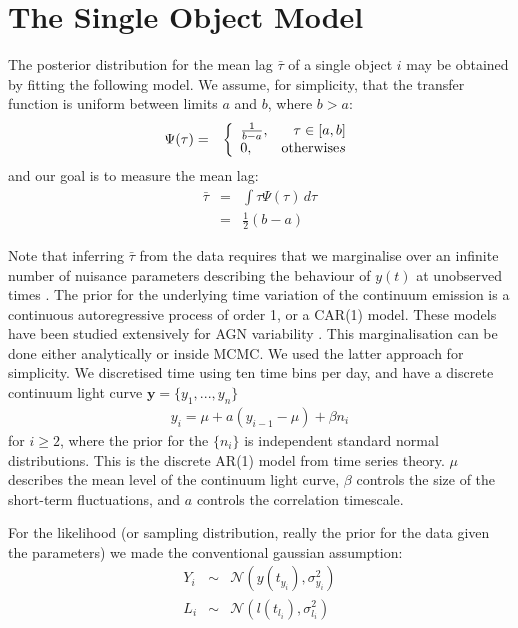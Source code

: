 \documentclass[useAMS,usenatbib]{mn2e}
\begin{document}
\section{The Single Object Model}
The posterior distribution for the mean lag $\bar{\tau}$ of a single object
$i$ may be obtained
by fitting the following model. We assume, for simplicity, that
the transfer function is uniform
between limits $a$ and $b$, where $b > a$:
\begin{eqnarray}
\Psi(\tau) &=& \left\{
\begin{array}{lr}
\frac{1}{b-a}, & \tau \in [a,b]\\
0, & \textnormal{otherwise}s
\end{array}\right.
\end{eqnarray}
and our goal is to measure the mean lag:
\begin{eqnarray}
\bar{\tau} &=& \int \tau \Psi(\tau) \, d\tau\\
&=& \frac{1}{2}(b-a)
\end{eqnarray}

Note that inferring $\bar{\tau}$ from the data requires that we
marginalise over an infinite number of nuisance parameters describing the
behaviour of $y(t)$ at unobserved times \citep{pancoast}.
The prior for the underlying time variation of the continuum emission is
a continuous autoregressive process of order 1, or a CAR(1) model. These models
have been studied extensively for AGN variability
\citep[e.g.][]{2009ApJ...698..895K, 2011ApJ...735...80Z, 2013ApJ...765..106Z}.
This marginalisation can be done
either analytically or inside MCMC. We used the latter approach for simplicity.
We discretised
time using ten time bins per day, and have a discrete continuum light curve
$\mathbf{y} = \{y_1, ..., y_n\}$
\begin{eqnarray}
y_i = \mu + a\left(y_{i-1} - \mu\right) + \beta n_i
\end{eqnarray}
for $i \geq 2$, where the prior for the $\{n_i\}$ is independent standard
normal distributions. This is the discrete AR(1) model from time series theory.
$\mu$ describes the mean level of the continuum light curve, $\beta$ controls
the size of the short-term fluctuations, and $a$ controls the correlation
timescale.

For the likelihood (or sampling distribution, really the prior for the data
given the parameters) we made the conventional gaussian assumption:
\begin{eqnarray}
Y_i &\sim& \mathcal{N}\left(y(t_{y_i}), \sigma_{y_i}^2\right)\\
L_i &\sim& \mathcal{N}\left(l(t_{l_i}), \sigma_{l_i}^2\right)
\end{eqnarray}
\end{document}
